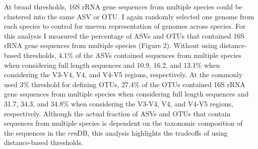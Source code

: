 \documentclass[
]{article}
\begin{document}
At broad thresholds, 16S rRNA gene sequences from multiple species could
be clustered into the same ASV or OTU. I again randomly selected one
genome from each species to control for uneven representation of genomes
across species. For this analysis I measured the percentage of ASVs and
OTUs that contained 16S rRNA gene sequences from multiple species
(Figure 2). Without using distance-based thresholds, 4.1\% of the ASVs
contained sequences from multiple species when considering full length
sequences and 10.9, 16.2, and 13.1\% when considering the V3-V4, V4, and
V4-V5 regions, respectively. At the commonly used 3\% threshold for
defining OTUs, 27.4\% of the OTUs contained 16S rRNA gene sequences from
multiple species when considering full length sequences and 31.7, 34.3,
and 34.8\% when considering the V3-V4, V4, and V4-V5 regions,
respectively. Although the actual fraction of ASVs and OTUs that contain
sequences from multiple species is dependent on the taxonomic
composition of the sequences in the \emph{rrn}DB, this analysis
highlights the tradeoffs of using distance-based thresholds.
\end{document}
